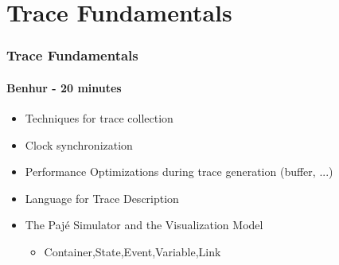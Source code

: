 \section{Trace Fundamentals}

\frame
{
  \frametitle{Trace Fundamentals}
  \framesubtitle{Benhur - 20 minutes}

  \begin{itemize}
  \item Techniques for trace collection
  \item Clock synchronization
  \item Performance Optimizations during trace generation (buffer, ...)
  \item Language for Trace Description 
  \item The Paj\'e Simulator and the Visualization Model
       \begin{itemize}
       \item Container,State,Event,Variable,Link
       \end{itemize}
  \end{itemize}
}
